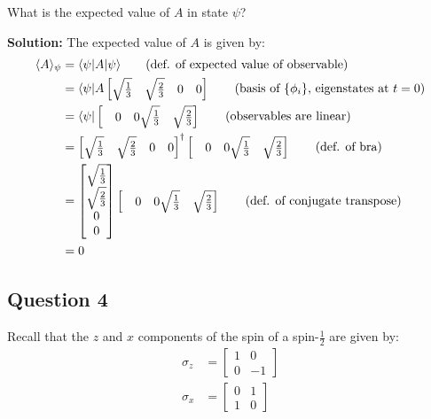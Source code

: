 \documentclass{article}
\begin{document}
What is the expected value of $A$ in state $\psi$?
\bigskip

\noindent\textbf{Solution:} The expected value of $A$ is given by:
\begin{align*}
    \langle A\rangle_\psi&=\langle\psi|A|\psi\rangle\tag{def. of expected value of observable}\\
    &=\langle\psi|A\begin{bmatrix}
        \sqrt{\frac{1}{3}}&\sqrt{\frac{2}{3}}&0&0
    \end{bmatrix}\tag{basis of $\{\phi_i\}$, eigenstates at $t=0$}\\
    &=\langle\psi|\begin{bmatrix}
        &0&0\sqrt{\frac{1}{3}}&\sqrt{\frac{2}{3}}
    \end{bmatrix}\tag{observables are linear}\\
    &=\begin{bmatrix}
        \sqrt{\frac{1}{3}}&\sqrt{\frac{2}{3}}&0&0
    \end{bmatrix}^\dagger\begin{bmatrix}
        &0&0\sqrt{\frac{1}{3}}&\sqrt{\frac{2}{3}}
    \end{bmatrix}\tag{def. of bra}\\
    &=\begin{bmatrix}
        \sqrt{\frac{1}{3}}\\\sqrt{\frac{2}{3}}\\0\\0
    \end{bmatrix}\begin{bmatrix}
        &0&0\sqrt{\frac{1}{3}}&\sqrt{\frac{2}{3}}
    \end{bmatrix}\tag{def. of conjugate transpose}\\
    &=0
\end{align*}
\bigskip
\newpage

\subsection*{Question 4}
Recall that the $z$ and $x$ components of the spin of a spin-$\frac{1}{2}$ are given by:
\begin{align*}
    \sigma_z&=\begin{bmatrix}
        1&0\\0&-1
    \end{bmatrix}\\
    \sigma_x&=\begin{bmatrix}
        0&1\\1&0
    \end{bmatrix}
\end{align*}
\bigskip
\end{document}

